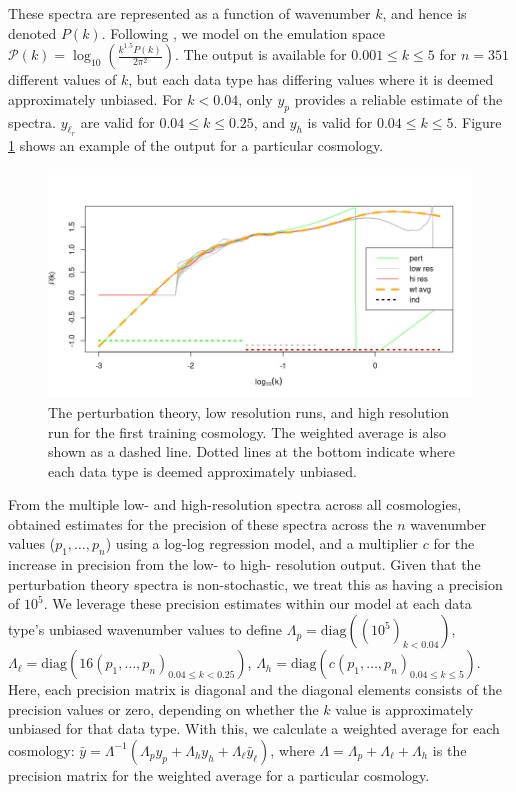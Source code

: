 \documentclass[11pt]{article}
\begin{document}
These spectra are represented as a function of wavenumber $k$, and hence is denoted $P(k)$. Following \cite{moran2023mira}, we model on the emulation space $\mathcal{P}(k)=\log_{10}\left(\frac{k^{1.5}P(k)}{2\pi^2}\right)$. The output is available for $0.001 \leq k \leq 5$ for $n=351$ different values of $k$, but each data type has differing values where it is deemed approximately unbiased. For $k<0.04$, only $y_p$ provides a reliable estimate of the spectra. $y_{\ell_r}$ are valid for $0.04 \leq k \leq 0.25$, and $y_h$ is valid for $0.04 \leq k \leq 5$. Figure \ref{fig:plot_data} shows an example of the output for a particular cosmology.

\begin{figure}[ht]
    \centering
    \includegraphics[width=6in]{plot_data.png}
    \caption{The perturbation theory, low resolution runs, and high resolution run for the first training cosmology. The weighted average is also shown as a dashed line. Dotted lines at the bottom indicate where each data type is deemed approximately unbiased.}
    \label{fig:plot_data}
\end{figure}

From the multiple low- and high-resolution spectra across all cosmologies, \cite{moran2023mira} obtained estimates for the precision of these spectra across the $n$ wavenumber values ($p_1,\dots,p_n$) using a log-log regression model, and a multiplier $c$ for the increase in precision from the low- to high- resolution output. Given that the perturbation theory spectra is non-stochastic, we treat this as having a precision of $10^5$. We leverage these precision estimates within our model at each data type's unbiased wavenumber values to define $\Lambda_p = \text{diag}\left((10^5)_{k < 0.04}\right)$, $\Lambda_{\ell} = \text{diag}\left(16(p_1,\dots,p_n)_{0.04 \leq k < 0.25}\right)$, $\Lambda_h = \text{diag}\left(c(p_1,\dots,p_n)_{0.04 \leq k \leq 5}\right)$. Here, each precision matrix is diagonal and the diagonal elements consists of the precision values or zero, depending on whether the $k$ value is approximately unbiased for that data type. With this, we calculate a weighted average for each cosmology: $\bar y = \Lambda^{-1}(\Lambda_p y_p + \Lambda_h y_h + \Lambda_{\ell} \bar{y}_\ell)$, where $\Lambda = \Lambda_p + \Lambda_\ell + \Lambda_h$ is the precision matrix for the weighted average for a particular cosmology.
\end{document}
